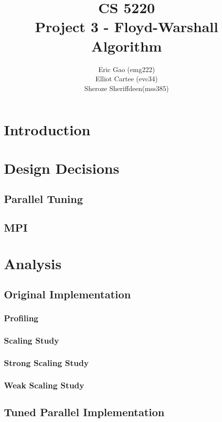 \documentclass[11pt]{article}
\begin{document}
\title{CS 5220\\ Project 3 - Floyd-Warshall Algorithm}
\author{Eric Gao (emg222)\\ Elliot Cartee (evc34)\\ Sheroze Sheriffdeen(mss385)}
\maketitle

\section{Introduction}


\section{Design Decisions}
 
 \subsection{Parallel Tuning}
 \subsection{MPI}

\section{Analysis}

\subsection{Original Implementation}
\subsubsection{Profiling} \label{sec:prof}
\subsubsection{Scaling Study} \label{sec:speedup}
\subsubsection{Strong Scaling Study}
\subsubsection{Weak Scaling Study}

\subsection{Tuned Parallel Implementation}
\end{document}
